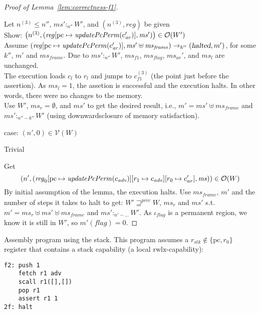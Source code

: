 \documentclass[a4paper]{article}
\newcommand{\update}[2]{[#1 \mapsto #2]}
\newcommand{\var}[1]{\mathit{#1}}
\newcommand{\hs}{\var{ms}}
\newcommand{\ms}{\hs}
\newcommand{\pcreg}{\mathrm{pc}}
\newcommand{\reg}{\var{reg}}
\newcommand{\heap}{\var{mem}}
\newcommand{\stk}{\var{stk}}
\newcommand{\flag}{\var{flag}}
\newcommand{\halted}{\textsl{halted}}
\newcommand{\plainfun}[2]{
  \ifthenelse{\equal{#2}{}}
  {\mathit{#1}}
  {\mathit{#1}(#2)}
}
\newcommand{\updatePcPerm}[1]{\plainfun{updatePcPerm}{#1}}
\newcommand{\futurestr}{\mathbin{\sqsupseteq}^{\var{priv}}}
\newcommand{\heapSat}[3][\heap]{#1 :_{#2} #3}
\newcommand{\asmType}{\plaindom{AsmType}}
\newcommand{\plaindom}[1]{\mathrm{#1}}
\newcommand{\intr}[2]{\mathcal{#1}}
\newcommand{\valueintr}[1]{\intr{V}{#1}}
\newcommand{\stdvr}{\valueintr{\asmType}}
\newcommand{\observations}{\mathcal{O}}
\newcommand{\npair}[2][n]{\left(#1,#2 \right)}
\newcommand{\plainperm}[1]{\mathrm{#1}}
\newcommand{\rwlx}{\plainperm{rwlx}}
\newcommand{\step}[1][]{\rightarrow_{#1}}
\begin{document}
\begin{proof}[Proof of Lemma~\ref{lem:correctness-f1}]
\begin{enumproof}[resume]
\begin{enumproof}
\begin{enumproof}
        Let $n^{(3)} \leq n''$, $\heapSat[\ms']{n''}{W'}$, and $\npair[n^{(3)}]{\reg}$ be given\\
        Show: $\npair[n^{(3)}]{(\reg\update{\pcreg}{\updatePcPerm{c_{\var{ar}}'}},\ms')} \in \observations(W')$\\
        Assume $(\reg\update{\pcreg}{\updatePcPerm{c_{\var{ar}}'}},\ms' \uplus \ms_{\var{frame}}) \step[k''] (\halted, m')$, for some $k''$, $m'$ and $\ms_{\var{frame}}$. Due to $\heapSat[\ms']{n''}{W'}$, $\ms_{f1}$, $\ms_\flag$, $\ms_{\var{ar}}'$, and $\ms_l$ are unchanged. \\
        The execution loads $c_l$ to $r_l$ and jumps to $c_{f1}^{(3)}$ (the point just before the assertion). As $\ms_l = 1$, the assetion is successful and the execution halts. In other words, there were no changes to the memory.\\
        Use $W'$, $\ms_r = \emptyset$, and $\ms'$ to get the desired result, i.e., $m' = \ms' \uplus \ms_{\var{frame}}$ and $\heapSat[\ms']{n''-k''}{W'}$ (using downwardsclosure of memory satisfaction).          
      \end{enumproof}
    \item case: $\npair[n']{0} \in \stdvr(W)$
      \begin{enumproof}
      \item Trivial
      \end{enumproof}
    \end{enumproof}
  \end{enumproof}
  Get
  \[
    \npair[n']{(\reg_0\update{\pcreg}{\updatePcPerm{c_{\var{adv}}}}\update{r_1}{c_{\var{adv}}}\update{r_0}{c_{ar}'},\ms)} \in \observations(W)
  \]
  By initial assumption of the lemma, the execution halts. Use $\ms_{\var{frame}}$, $m'$ and the number of steps it takes to halt to get:
  $W' \futurestr W$, $\ms_r$ and $\ms'$ s.t. $m' = \ms_r \uplus \ms' \uplus \ms_{\var{frame}}$ and $\heapSat[\ms']{n' - \dots}{W'}$. As $\iota_\flag$ is a permanent region, we know it is still in $W'$, so $m'(\flag) = 0$.
\end{proof}


Assembly program using the stack. This program assumes a $r_\stk \not\in \{\pcreg,r_0\}$ register that contains a stack capability (a local $\rwlx$-capability):
\begin{verbatim}
f2: push 1
    fetch r1 adv
    scall r1([],[])
    pop r1
    assert r1 1
2f: halt
\end{verbatim}
              
\end{document}
